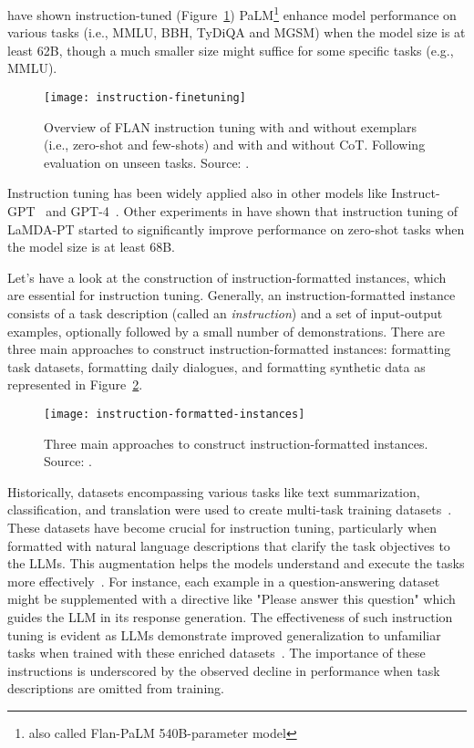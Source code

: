 \textcite{chung2022scaling} have shown instruction-tuned (Figure~\ref{fig:instruction-finetuning}) PaLM\footnote{also called Flan-PaLM 540B-parameter model} enhance model performance on various tasks (i.e., MMLU, BBH, TyDiQA and MGSM) when the model size is at least 62B, though a much smaller size might suffice for some specific tasks (e.g., MMLU).

\begin{figure}[h!]
	\centering
	\texttt{[image: instruction-finetuning]}
	\caption{Overview of FLAN instruction tuning with and without exemplars (i.e., zero-shot and few-shots) and with and without CoT. Following evaluation on unseen tasks. Source: \textcite{chung2022scaling}.}
	\label{fig:instruction-finetuning}
\end{figure}

Instruction tuning has been widely applied also in other models like Instruct-GPT~\cite{ouyang2022training} and GPT-4~\cite{radford2023gpt4}.
Other experiments in \textcite{wei2022fine} have shown that instruction tuning of LaMDA-PT started to significantly improve performance on zero-shot tasks when the model size is at least 68B\@.

Let's have a look at the construction of instruction-formatted instances, which are essential for instruction tuning.
Generally, an instruction-formatted instance consists of a task description (called an \textit{instruction}) and a set of input-output examples, optionally followed by a small number of demonstrations.
There are three main approaches to construct instruction-formatted instances: formatting task datasets, formatting daily dialogues, and formatting synthetic data as represented in Figure~\ref{fig:instruction-formatted-instances}.

\begin{figure}[h!]
	\centering
	\texttt{[image: instruction-formatted-instances]}
	\caption{Three main approaches to construct instruction-formatted instances. Source: \textcite{survey}.}
	\label{fig:instruction-formatted-instances}
\end{figure}

Historically, datasets encompassing various tasks like text summarization, classification, and translation were used to create multi-task training datasets~\cite{tang2022mvp,liu2019multi,aghajanyan2021muppet}.
These datasets have become crucial for instruction tuning, particularly when formatted with natural language descriptions that clarify the task objectives to the LLMs. This augmentation helps the models understand and execute the tasks more effectively~\cite{sanhetal2022multitask,ouyang2022training,wei2022fine, wang2022super}.
For instance, each example in a question-answering dataset might be supplemented with a directive like "Please answer this question" which guides the LLM in its response generation.
The effectiveness of such instruction tuning is evident as LLMs demonstrate improved generalization to unfamiliar tasks when trained with these enriched datasets~\cite{wei2022fine}.
The importance of these instructions is underscored by the observed decline in performance when task descriptions are omitted from training.

